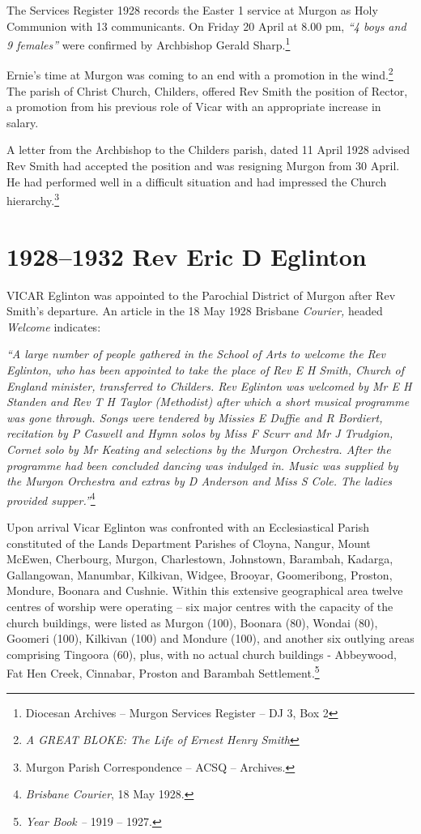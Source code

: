 The Services Register 1928 records the Easter 1 service at Murgon as Holy Communion with 13 communicants. On Friday 20 April at 8.00 pm, \emph{``4 boys and 9 females''} were confirmed by Archbishop Gerald Sharp.\footnote{Diocesan Archives -- Murgon Services Register -- DJ 3, Box 2}


Ernie's time at Murgon was coming to an end with a promotion in the wind.\footnote{\emph{A GREAT BLOKE: The Life of Ernest Henry Smith}} The parish of Christ Church, Childers, offered Rev Smith the position of Rector, a promotion from his previous role of Vicar with an appropriate increase in salary.


A letter from the Archbishop to the Childers parish, dated 11 April 1928 advised Rev Smith had accepted the position and was resigning Murgon from 30 April. He had performed well in a difficult situation and had impressed the Church hierarchy.\footnote{Murgon Parish Correspondence -- ACSQ -- Archives.}


\printendnotes[custom]
\setcounter{endnote}{0}




\chapter{1928--1932 Rev Eric D Eglinton}
\nobalance


\lettrine[lines=3]{V}{ICAR}
 Eglinton was appointed to the Parochial District of Murgon after Rev Smith's departure. An article in the 18 May 1928 Brisbane \emph{Courier,} headed \emph{Welcome} indicates:

\emph{``A large number of people gathered in the School of Arts to welcome the Rev Eglinton, who has been appointed to take the place of Rev E H Smith, Church of England minister, transferred to Childers. Rev Eglinton was welcomed by Mr E H Standen and Rev T H Taylor (Methodist) after which a short musical programme was gone through. Songs were tendered by Missies E Duffie and R Bordiert, recitation by P Caswell and Hymn solos by Miss F Scurr and Mr J Trudgion, Cornet solo by Mr Keating and selections by the Murgon Orchestra. After the programme had been concluded dancing was indulged in. Music was supplied by the Murgon Orchestra and extras by D Anderson and Miss S Cole. The ladies provided supper.''}\footnote{\emph{Brisbane Courier}, 18 May 1928.}


Upon arrival Vicar Eglinton was confronted with an Ecclesiastical Parish constituted of the Lands Department Parishes of Cloyna, Nangur, Mount McEwen, Cherbourg, Murgon, Charlestown, Johnstown, Barambah, Kadarga, Gallangowan, Manumbar, Kilkivan, Widgee, Brooyar, Goomeribong, Proston, Mondure, Boonara and Cushnie. Within this extensive geographical area twelve centres of worship were operating -- six major centres with the capacity of the church buildings, were listed as Murgon (100), Boonara (80), Wondai (80), Goomeri (100), Kilkivan (100) and Mondure (100), and another six outlying areas comprising Tingoora (60), plus, with no actual church buildings - Abbeywood, Fat Hen Creek, Cinnabar, Proston and Barambah Settlement.\footnote{\emph{Year Book --} 1919 -- 1927.}


